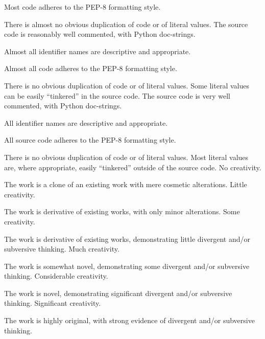 \documentclass{../../fal_assignment}
\begin{document}
\begin{markingrubric}
            \par Most code adheres to the PEP-8 formatting style.
             \par There is almost no obvious duplication of code or of literal values.   
        \grade The source code is reasonably well commented, with Python doc-strings.
            \par Almost all identifier names are descriptive and appropriate.
            \par Almost all code adheres to the PEP-8 formatting style.
             \par There is no obvious duplication of code or of literal values. Some literal values can be easily ``tinkered'' in the source code. 
        \grade The source code is very well commented, with Python doc-strings.
            \par All identifier names are descriptive and appropriate.
            \par All source code adheres to the PEP-8 formatting style.
             \par There is no obvious duplication of code or of literal values. Most literal values are, where appropriate, easily ``tinkered'' outside of the source code.  
%
        \grade\fail No creativity.
            \par The work is a clone of an existing work with mere cosmetic alterations.
        \grade Little creativity.
            \par The work is derivative of existing works, with only minor alterations.
        \grade Some creativity.
            \par The work is derivative of existing works, demonstrating little divergent and/or subversive thinking.
        \grade Much creativity.
            \par The work is somewhat novel, demonstrating some divergent and/or subversive thinking.
        \grade Considerable creativity.
            \par The work is novel, demonstrating significant divergent and/or subversive thinking.
        \grade Significant creativity.
            \par The work is highly original, with strong evidence of divergent and/or subversive thinking.
%
\end{markingrubric}
\end{document}
